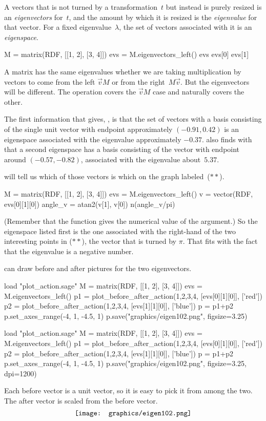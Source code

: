 A vectors that is not turned by a transformation~$t$ but instead
is purely resized 
is an \textit{eigenvectors} for~$t$, and the amount by which it is 
resized is the \textit{eigenvalue} for that vector.
For a fixed eigenvalue~$\lambda$, the set of vectors associated with
it is an \textit{eigenspace}.
\begin{sageoutput}[s,3,59,13]
M = matrix(RDF, [[1, 2], [3, 4]])
evs = M.eigenvectors_left()
evs
evs[0] 
evs[1]
\end{sageoutput}
\noindent
A matrix has the same eigenvalues whether we are taking multiplication 
by vectors to come from the left $\vec{v}M$ or from the 
right~$M\vec{v}$.  
But the eigenvectors will be different. 
The \Sage{} operation  covers the 
$\vec{v}M$ case and naturally 
covers the other.

The first information that \Sage{} gives, , 
is that the set of vectors with a basis consisting of the single unit
vector with endpoint approximately $(-0.91, 0.42)$  is an
eigenspace associated with the eigenvalue approximately $-0.37$.
\Sage{} also finds with  that a second eigenspace
has a basis consisting of the vector with endpoint around
$(-0.57, -0.82)$, associated with the
eigenvalue about~$5.37$. 

\Sage{} will tell us which of those vectors is which on the graph 
labeled~($**$).
\begin{sageoutput}
M = matrix(RDF, [[1, 2], [3, 4]])
evs = M.eigenvectors_left()
v = vector(RDF, evs[0][1][0])
angle_v = atan2(v[1], v[0]) 
n(angle_v/pi) 
\end{sageoutput}
(Remember that the  function gives the numerical value of
the argument.)
So the eigenspace listed first is the one associated with the right-hand
of the two interesting points in ($**$), the vector that is turned by
$\pi$.
That fits with the fact that the eigenvalue is a negative number.

\Sage{} can draw before and after pictures for the two eigenvectors.
\begin{sageoutput}[d,0,3]
load "plot_action.sage"  
M = matrix(RDF, [[1, 2], [3, 4]])
evs = M.eigenvectors_left()  
p1 = plot_before_after_action(1,2,3,4, [evs[0][1][0]], ['red']) 
p2 = plot_before_after_action(1,2,3,4, [evs[1][1][0]], ['blue']) 
p = p1+p2
p.set_axes_range(-4, 1, -4.5, 1) 
p.save("graphics/eigen102.png", figsize=3.25)
\end{sageoutput}
\begin{sagesilent}
load "plot_action.sage"  
M = matrix(RDF, [[1, 2], [3, 4]])
evs = M.eigenvectors_left()  
p1 = plot_before_after_action(1,2,3,4, [evs[0][1][0]], ['red']) 
p2 = plot_before_after_action(1,2,3,4, [evs[1][1][0]], ['blue']) 
p = p1+p2
p.set_axes_range(-4, 1, -4.5, 1) 
p.save("graphics/eigen102.png", figsize=3.25, dpi=1200)
\end{sagesilent}
\noindent
Each before vector is a unit vector, so it is easy to pick it from among the
two.
The after vector is scaled from the before vector.
\begin{equation*}
  \vcenteredhbox{\texttt{[image: graphics/eigen102.png]}}
\end{equation*}


